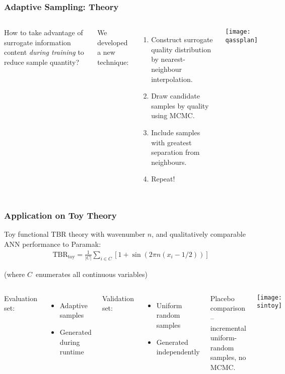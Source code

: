 \begin{frame}
	\frametitle{Adaptive Sampling: Theory}
	 \begin{columns}[onlytextwidth,T]
      \column{\dimexpr\linewidth-6cm-5mm}
        
        How to take advantage of surrogate information content \textit{during training} to reduce sample quantity? \newline
        
		We developed \alert{a new technique:}
        \vspace{-1em}
        \begin{enumerate}
        \item Construct surrogate quality distribution by nearest- neighbour interpolation.
        \item Draw candidate samples by quality using MCMC.
        \item Include samples with greatest separation from neighbours.
        \item Repeat!
        \end{enumerate}
      \column{6cm}
      \texttt{[image: qassplan]}

    \end{columns}
\end{frame}

\begin{frame}
	\frametitle{Application on Toy Theory}
	Toy functional TBR theory with wavenumber $n$, and qualitatively comparable ANN performance to Paramak:
	\begin{align*}
		\text{TBR}_\text{toy} = \frac{1}{|C|}\sum_{i \in C} \left[1 + \sin(2\pi n (x_i - 1/2)) \right]
	\end{align*}

	\vspace{-1em}
	{\footnotesize
		\hfill(where $C$~enumerates all continuous variables)
	}

	\vspace{1em}

	\begin{columns}[T]
		\column{0.5\paperwidth}
		\vspace{-0.5em}
		Evaluation set:
		\begin{itemize}
		    \item Adaptive samples
		    \item Generated during runtime
		\end{itemize}
		\vspace{0.5em}
		Validation set:
		\begin{itemize}
		    \item Uniform random samples
		    \item Generated independently
		\end{itemize}
		\vspace{15pt}

		Placebo comparison -- incremental uniform-random samples, no MCMC.


		\column{0.4\paperwidth}
		\hspace{-20pt}\texttt{[image: sintoy]}

	\end{columns}
\end{frame}

